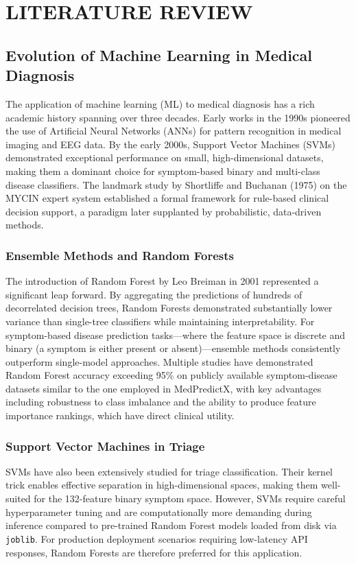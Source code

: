 \chapter{LITERATURE REVIEW}

\section{Evolution of Machine Learning in Medical Diagnosis}

The application of machine learning (ML) to medical diagnosis has a rich academic history spanning over three decades. Early works in the 1990s pioneered the use of Artificial Neural Networks (ANNs) for pattern recognition in medical imaging and EEG data. By the early 2000s, Support Vector Machines (SVMs) demonstrated exceptional performance on small, high-dimensional datasets, making them a dominant choice for symptom-based binary and multi-class disease classifiers. The landmark study by Shortliffe and Buchanan (1975) on the MYCIN expert system established a formal framework for rule-based clinical decision support, a paradigm later supplanted by probabilistic, data-driven methods.

\subsection{Ensemble Methods and Random Forests}
The introduction of Random Forest by Leo Breiman in 2001 represented a significant leap forward. By aggregating the predictions of hundreds of decorrelated decision trees, Random Forests demonstrated substantially lower variance than single-tree classifiers while maintaining interpretability. For symptom-based disease prediction tasks---where the feature space is discrete and binary (a symptom is either present or absent)---ensemble methods consistently outperform single-model approaches. Multiple studies have demonstrated Random Forest accuracy exceeding 95\% on publicly available symptom-disease datasets similar to the one employed in MedPredictX, with key advantages including robustness to class imbalance and the ability to produce feature importance rankings, which have direct clinical utility.

\subsection{Support Vector Machines in Triage}
SVMs have also been extensively studied for triage classification. Their kernel trick enables effective separation in high-dimensional spaces, making them well-suited for the 132-feature binary symptom space. However, SVMs require careful hyperparameter tuning and are computationally more demanding during inference compared to pre-trained Random Forest models loaded from disk via \texttt{joblib}. For production deployment scenarios requiring low-latency API responses, Random Forests are therefore preferred for this application.


